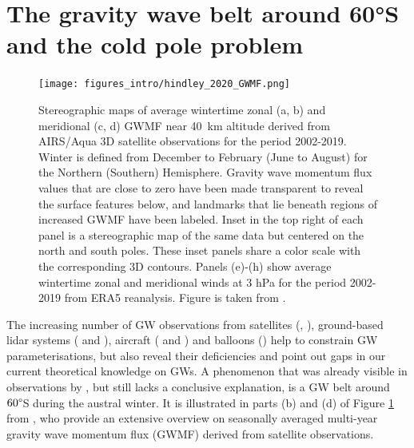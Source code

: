 \section{The gravity wave belt around 60°S and the cold pole problem}
\label{sec:waveBelt} %
\begin{figure}[ht]
    \centering
    \texttt{[image: figures\_intro/hindley\_2020\_GWMF.png]}
    \caption{Stereographic maps of average wintertime zonal (a, b) and meridional (c, d) GWMF near \SI{40}{\kilo\meter} altitude derived from AIRS/Aqua 3D satellite observations for the period 2002-2019. Winter is defined from December to February (June to August) for the Northern (Southern) Hemisphere. Gravity wave momentum flux values that are close to zero have been made transparent to reveal the surface features below, and landmarks that lie beneath regions of increased GWMF have been labeled. Inset in the top right of each panel is a stereographic map of the same data but centered on the north and south poles. These inset panels share a color scale with the corresponding 3D contours. Panels (e)-(h) show average wintertime zonal and meridional winds at 3 hPa for the period 2002-2019 from ERA5 reanalysis. Figure is taken from \cite{hindley_18year_2020}.}
    \label{fig:hindley_2020_GWMF}
\end{figure}
%
The increasing number of GW observations from satellites (\cite{hindley_gravity_2019}, \citeyear{hindley_18year_2020}), ground-based lidar systems (\cite{kaifler_lidar_2020} and  \cite{kaifler_compact_2021}), aircraft (\cite{rapp_southtrac-gw_2021} and \cite{fritts_deep_2016}) and  balloons (\cite{plougonven_gravity_2013}) help to constrain GW parameterisations, but also reveal their deficiencies and point out gaps in our current theoretical knowledge on GWs. A phenomenon that was already visible in observations by \textcite{wu_satellite_1996}, but still lacks a conclusive explanation, is a GW belt around $60 \degree$S during the austral winter. It is illustrated in parts (b) and (d) of Figure \ref{fig:hindley_2020_GWMF} from \textcite{hindley_18year_2020}, who provide an extensive overview on seasonally averaged multi-year gravity wave momentum flux (GWMF) derived from satellite observations. \\
